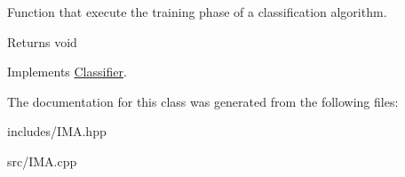 Function that execute the training phase of a classification algorithm. 

\begin{DoxyReturn}{Returns}
void 
\end{DoxyReturn}


Implements \hyperlink{class_classifier_a2306a5de27555ab093593ac9642bc7d9}{Classifier}.



The documentation for this class was generated from the following files\+:\begin{DoxyCompactItemize}
\item 
includes/I\+M\+A.\+hpp\item 
src/I\+M\+A.\+cpp\end{DoxyCompactItemize}
